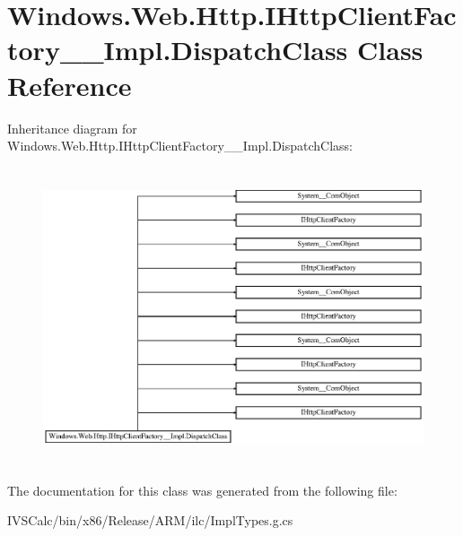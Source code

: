\hypertarget{class_windows_1_1_web_1_1_http_1_1_i_http_client_factory_____impl_1_1_dispatch_class}{}\section{Windows.\+Web.\+Http.\+I\+Http\+Client\+Factory\+\_\+\+\_\+\+Impl.\+Dispatch\+Class Class Reference}
\label{class_windows_1_1_web_1_1_http_1_1_i_http_client_factory_____impl_1_1_dispatch_class}
Inheritance diagram for Windows.\+Web.\+Http.\+I\+Http\+Client\+Factory\+\_\+\+\_\+\+Impl.\+Dispatch\+Class\+:\begin{figure}[H]
\begin{center}
\leavevmode
\includegraphics[height=8.800000cm]{class_windows_1_1_web_1_1_http_1_1_i_http_client_factory_____impl_1_1_dispatch_class}
\end{center}
\end{figure}


The documentation for this class was generated from the following file\+:\begin{DoxyCompactItemize}
\item 
I\+V\+S\+Calc/bin/x86/\+Release/\+A\+R\+M/ilc/Impl\+Types.\+g.\+cs\end{DoxyCompactItemize}
